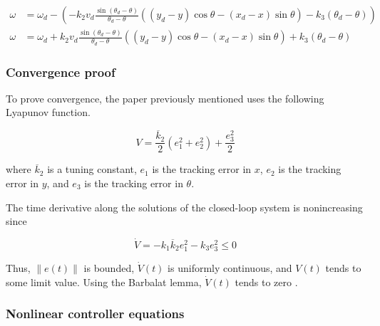 \begin{align*}
  \omega &= \omega_d -
    \left(-k_2 v_d \frac{\sin(\theta_d - \theta)}{\theta_d - \theta}
    ((y_d - y) \cos\theta - (x_d - x) \sin\theta) -
      k_3 (\theta_d - \theta)\right) \\
  \omega &= \omega_d + k_2 v_d \frac{\sin(\theta_d - \theta)}{\theta_d - \theta}
    ((y_d - y) \cos\theta - (x_d - x) \sin\theta) + k_3 (\theta_d - \theta)
\end{align*}

\subsubsection{Convergence proof}

To prove convergence, the paper previously mentioned uses the following Lyapunov
function.

\begin{equation*}
  V = \frac{\overline{k}_2}{2}(e_1^2 + e_2^2) + \frac{e_3^2}{2}
\end{equation*}

where $\overline{k}_2$ is a tuning constant, $e_1$ is the tracking error in $x$,
$e_2$ is the tracking error in $y$, and $e_3$ is the tracking error in $\theta$.

The time derivative along the solutions of the closed-loop \gls{system} is
nonincreasing since

\begin{equation*}
  \dot{V} = -k_1 \overline{k}_2 e_1^2 - k_3 e_3^2 \leq 0
\end{equation*}

Thus, $\lVert e(t) \rVert$ is bounded, $\dot{V}(t)$ is uniformly continuous,
and $V(t)$ tends to some limit value. Using the Barbalat lemma, $\dot{V}(t)$
tends to zero \cite{bib:ctrl_wheeled_mobile_robots}.

\subsubsection{Nonlinear controller equations}

